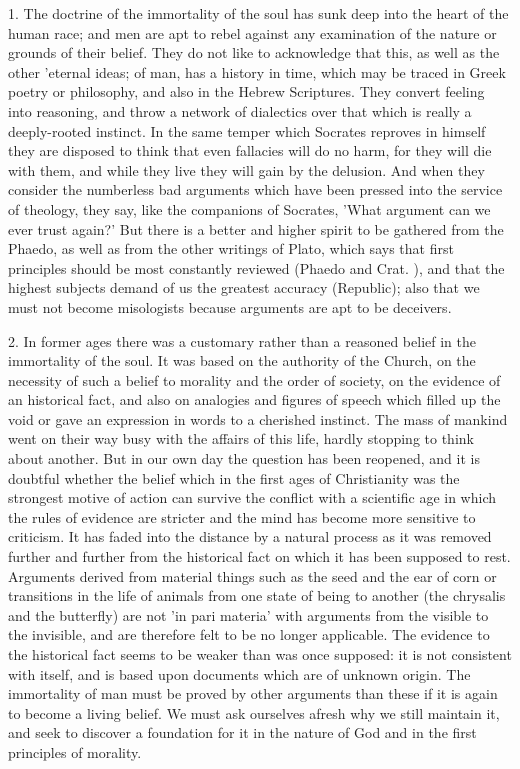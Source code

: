 \documentclass[11pt,letter]{article}
\begin{document}
\par  1. The doctrine of the immortality of the soul has sunk deep into the heart of the human race; and men are apt to rebel against any examination of the nature or grounds of their belief. They do not like to acknowledge that this, as well as the other 'eternal ideas; of man, has a history in time, which may be traced in Greek poetry or philosophy, and also in the Hebrew Scriptures. They convert feeling into reasoning, and throw a network of dialectics over that which is really a deeply-rooted instinct. In the same temper which Socrates reproves in himself they are disposed to think that even fallacies will do no harm, for they will die with them, and while they live they will gain by the delusion. And when they consider the numberless bad arguments which have been pressed into the service of theology, they say, like the companions of Socrates, 'What argument can we ever trust again?' But there is a better and higher spirit to be gathered from the Phaedo, as well as from the other writings of Plato, which says that first principles should be most constantly reviewed (Phaedo and Crat. ), and that the highest subjects demand of us the greatest accuracy (Republic); also that we must not become misologists because arguments are apt to be deceivers.

\par  2. In former ages there was a customary rather than a reasoned belief in the immortality of the soul. It was based on the authority of the Church, on the necessity of such a belief to morality and the order of society, on the evidence of an historical fact, and also on analogies and figures of speech which filled up the void or gave an expression in words to a cherished instinct. The mass of mankind went on their way busy with the affairs of this life, hardly stopping to think about another. But in our own day the question has been reopened, and it is doubtful whether the belief which in the first ages of Christianity was the strongest motive of action can survive the conflict with a scientific age in which the rules of evidence are stricter and the mind has become more sensitive to criticism. It has faded into the distance by a natural process as it was removed further and further from the historical fact on which it has been supposed to rest. Arguments derived from material things such as the seed and the ear of corn or transitions in the life of animals from one state of being to another (the chrysalis and the butterfly) are not 'in pari materia' with arguments from the visible to the invisible, and are therefore felt to be no longer applicable. The evidence to the historical fact seems to be weaker than was once supposed: it is not consistent with itself, and is based upon documents which are of unknown origin. The immortality of man must be proved by other arguments than these if it is again to become a living belief. We must ask ourselves afresh why we still maintain it, and seek to discover a foundation for it in the nature of God and in the first principles of morality.
\end{document}
